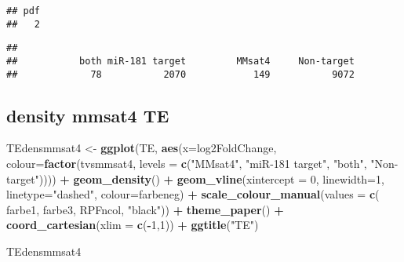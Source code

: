 \documentclass[
]{article}
\newenvironment{Shaded}{\begin{snugshade}}{\end{snugshade}}
\newcommand{\AttributeTok}[1]{\textcolor[rgb]{0.13,0.29,0.53}{#1}}
\newcommand{\DecValTok}[1]{\textcolor[rgb]{0.00,0.00,0.81}{#1}}
\newcommand{\FunctionTok}[1]{\textcolor[rgb]{0.13,0.29,0.53}{\textbf{#1}}}
\newcommand{\NormalTok}[1]{#1}
\newcommand{\OtherTok}[1]{\textcolor[rgb]{0.56,0.35,0.01}{#1}}
\newcommand{\SpecialCharTok}[1]{\textcolor[rgb]{0.81,0.36,0.00}{\textbf{#1}}}
\newcommand{\StringTok}[1]{\textcolor[rgb]{0.31,0.60,0.02}{#1}}
\begin{document}
\begin{verbatim}
## pdf 
##   2
\end{verbatim}

\begin{Shaded}
\end{Shaded}

\begin{verbatim}
## 
##           both miR-181 target         MMsat4     Non-target 
##             78           2070            149           9072
\end{verbatim}

\hypertarget{density-mmsat4-te}{%
\subsection{density mmsat4 TE}\label{density-mmsat4-te}}

\begin{Shaded}
\begin{Highlighting}[]
\NormalTok{TEdensmmsat4 }\OtherTok{\textless{}{-}} \FunctionTok{ggplot}\NormalTok{(TE, }\FunctionTok{aes}\NormalTok{(}\AttributeTok{x=}\NormalTok{log2FoldChange, }\AttributeTok{colour=}\FunctionTok{factor}\NormalTok{(tvsmmsat4, }\AttributeTok{levels =} \FunctionTok{c}\NormalTok{(}\StringTok{"MMsat4"}\NormalTok{, }\StringTok{"miR{-}181 target"}\NormalTok{, }\StringTok{"both"}\NormalTok{, }\StringTok{"Non{-}target"}\NormalTok{)))) }\SpecialCharTok{+}
  \FunctionTok{geom\_density}\NormalTok{() }\SpecialCharTok{+}
  \FunctionTok{geom\_vline}\NormalTok{(}\AttributeTok{xintercept =} \DecValTok{0}\NormalTok{, }\AttributeTok{linewidth=}\DecValTok{1}\NormalTok{, }\AttributeTok{linetype=}\StringTok{"dashed"}\NormalTok{, }\AttributeTok{colour=}\NormalTok{farbeneg) }\SpecialCharTok{+}
  \FunctionTok{scale\_colour\_manual}\NormalTok{(}\AttributeTok{values =} \FunctionTok{c}\NormalTok{( farbe1, farbe3, RPFncol, }\StringTok{"black"}\NormalTok{)) }\SpecialCharTok{+}
  \FunctionTok{theme\_paper}\NormalTok{() }\SpecialCharTok{+}
  \FunctionTok{coord\_cartesian}\NormalTok{(}\AttributeTok{xlim =} \FunctionTok{c}\NormalTok{(}\SpecialCharTok{{-}}\DecValTok{1}\NormalTok{,}\DecValTok{1}\NormalTok{)) }\SpecialCharTok{+}
  \FunctionTok{ggtitle}\NormalTok{(}\StringTok{"TE"}\NormalTok{)}

\NormalTok{TEdensmmsat4}
\end{Highlighting}
\end{Shaded}
\end{document}

